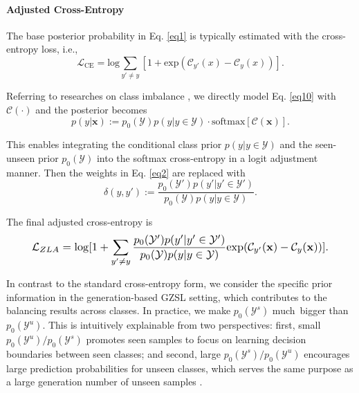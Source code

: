 \documentclass{article}
\begin{document}
\paragraph{Adjusted Cross-Entropy}
The base posterior probability in Eq. \ref{eq1} is typically estimated with the cross-entropy loss, i.e.,
\begin{equation}
\displaystyle
	\mathcal{L}_\mathrm{CE}=\mathrm{log}\sum_{y' \ne y}[1+ \mathrm {exp}(\mathcal{C}_{y'}(x)-\mathcal{C}_y(x))].
\label{eq11}
	\end{equation}
    
	Referring to researches on class imbalance \cite{tan2020equalization,menon2020long}, we directly model Eq. \ref{eq10} with $\mathcal{C}(\cdot)$ and the posterior becomes
\begin{equation}
\displaystyle
	p(y|\mathbf{x}):=p_0(\mathcal{Y})p(y|y \in \mathcal{Y})\cdot\mathrm{softmax}[\mathcal{C}(\mathbf{x})].
\label{eq12}
	\end{equation}
    
	This enables integrating the conditional class prior $p(y|y\in \mathcal{Y})$ and the seen-unseen prior $p_0(\mathcal{Y})$ into the softmax cross-entropy in a logit adjustment manner. Then the weights in Eq. \ref{eq2} are replaced with
\begin{equation}
\displaystyle
	\delta(y,y'):=\frac{p_0(\mathcal{Y}')p(y'|y'\in \mathcal{Y'})}{p_0(\mathcal{Y})p(y|y\in \mathcal{Y})}.
\label{eq13}
	\end{equation}
    
	The final adjusted cross-entropy is
	\begin{equation}
	\resizebox{0.89\linewidth}{!}{$
		\displaystyle
		\mathcal{L}_{ZLA}=\log [1+\sum_{y' \ne y}\frac{p_0(\mathcal{Y}')p(y'|y'\in \mathcal{Y'})}{p_0(\mathcal{Y})p(y|y\in \mathcal{Y})}  \mathrm {exp}(\mathcal{C}_{y'}(\mathbf{x})-\mathcal{C}_y(\mathbf{x}))].
		$}
        \label{eq14}
	\end{equation}
    
In contrast to the standard cross-entropy form, we consider the specific prior information in the generation-based GZSL setting, which contributes to the balancing results across classes. In practice, we make $p_0(\mathcal{Y}^s)$ much bigger than $p_0(\mathcal{Y}^u)$. This is intuitively explainable from two perspectives: first, small $p_0(\mathcal{Y}^u)/{p_0(\mathcal{Y}^s)}$ promotes seen samples to focus on learning decision boundaries between seen classes; and second, large $p_0(\mathcal{Y}^s)/{p_0(\mathcal{Y}^u)}$ encourages large prediction probabilities for unseen classes, which serves the same purpose as a large generation number of unseen samples \cite{xian2018feature,han2021contrastive}.
	
\end{document}
